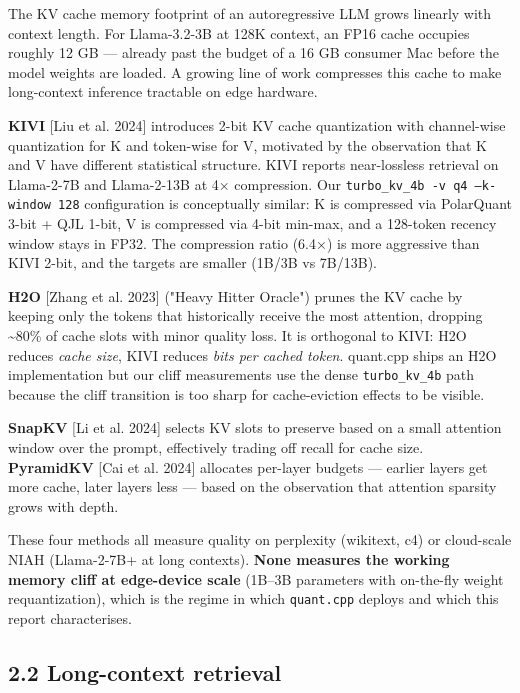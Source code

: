 \documentclass[11pt]{article}
\begin{document}
The KV cache memory footprint of an autoregressive LLM grows linearly with context length. For Llama-3.2-3B at 128K context, an FP16 cache occupies roughly 12 GB — already past the budget of a 16 GB consumer Mac before the model weights are loaded. A growing line of work compresses this cache to make long-context inference tractable on edge hardware.


\textbf{KIVI} [Liu et al. 2024] introduces 2-bit KV cache quantization with channel-wise quantization for K and token-wise for V, motivated by the observation that K and V have different statistical structure. KIVI reports near-lossless retrieval on Llama-2-7B and Llama-2-13B at 4× compression. Our \texttt{turbo\_kv\_4b -v q4 --k-window 128} configuration is conceptually similar: K is compressed via PolarQuant 3-bit + QJL 1-bit, V is compressed via 4-bit min-max, and a 128-token recency window stays in FP32. The compression ratio (6.4×) is more aggressive than KIVI 2-bit, and the targets are smaller (1B/3B vs 7B/13B).


\textbf{H2O} [Zhang et al. 2023] ("Heavy Hitter Oracle") prunes the KV cache by keeping only the tokens that historically receive the most attention, dropping \textasciitilde{}80\% of cache slots with minor quality loss. It is orthogonal to KIVI: H2O reduces \textit{cache size}, KIVI reduces \textit{bits per cached token}. quant.cpp ships an H2O implementation but our cliff measurements use the dense \texttt{turbo\_kv\_4b} path because the cliff transition is too sharp for cache-eviction effects to be visible.


\textbf{SnapKV} [Li et al. 2024] selects KV slots to preserve based on a small attention window over the prompt, effectively trading off recall for cache size. \textbf{PyramidKV} [Cai et al. 2024] allocates per-layer budgets — earlier layers get more cache, later layers less — based on the observation that attention sparsity grows with depth.


These four methods all measure quality on perplexity (wikitext, c4) or cloud-scale NIAH (Llama-2-7B+ at long contexts). \textbf{None measures the working memory cliff at edge-device scale} (1B–3B parameters with on-the-fly weight requantization), which is the regime in which \texttt{quant.cpp} deploys and which this report characterises.


\subsection*{2.2 Long-context retrieval}
\end{document}
